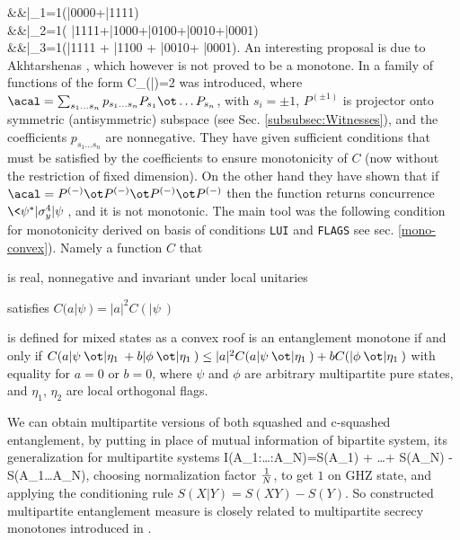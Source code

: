 \documentclass[rmp,12pt,preprint]{revtex4-2}
\begin{document}
\ben
&&|\Phi_1\>={1\over {}}(|0000\>+|1111\>) \nonumber \\
&&|\Phi_2\>={1\over {}}( |1111\>+|1000\>+|0100\>+|0010\>+|0001\>)
\nonumber \\
&&|\Phi_3\>={1}(|1111\> + |1100\> + |0010\>+ |0001\>).
\een
 An interesting proposal is due to Akhtarshenas
\cite{Akhtarshenas2003-multiconc}, which however is not proved to be
a monotone. In \cite{MintertKB2004-multi,DemkowiczBKM2006-multi}
a family of functions of the form
\be
C_{\acal}(|\psi\>)=2\sqrt{\<\psi|\ot \<\psi| {\acal} |\psi\>\ot |\psi\>}
\ee
was introduced, where $\acal=\sum_{s_1 \ldots s_n} p_{s_1 \ldots s_n}P_{s_1}
\ot \ldots P_{s_n}$,
with $s_i=\pm 1$, $P^{(\pm1)}$ is projector onto symmetric (antisymmetric)
subspace (see Sec. \ref{subsubsec:Witnesses}), and the coefficients $p_{s_1\ldots s_n}$ are nonnegative.
They have given sufficient conditions that must be satisfied by the coefficients to ensure monotonicity of $C$ (now without the restriction
of fixed dimension). On the other hand they have shown that  if $\acal = P^{(-)}\ot P^{(-)}\ot P^{(-)}\ot P^{(-)}$
then the function returns concurrence $\<\psi^*|\sigma_y^4|\psi\>$, and it is not monotonic.
The main tool was the following condition for monotonicity derived on basis of conditions {\tt LUI} and {\tt FLAGS} see sec. \ref{mono-convex}).
Namely  a function $C$ that\bei
\item is real, nonnegative and invariant under local unitaries
\item satisfies $C(a|\psi\>) = |a|^2C(|\psi\>)$
\item is defined for mixed states as a convex roof
\eei
is an entanglement monotone if and only if
$C(a|\psi\>\ot |\eta_1\> +b|\phi\>\ot |\eta_1\>) \leq |a|^2 C(a|\psi\>\ot |\eta_1\>) +bC(|\phi\>\ot |\eta_1\>)$
with equality for $a=0$ or $b=0$, where $\psi$  and $\phi$ are
arbitrary multipartite pure states, and $\eta_1$,  $\eta_2$  are local
orthogonal flags.

We can obtain multipartite versions of both squashed and c-squashed entanglement,
by putting in place of mutual information of bipartite system,
its generalization for multipartite systems \cite{multisquash}
\be
I(A_1:\ldots :A_N)=S(A_1) + \ldots + S(A_N) - S(A_1\ldots A_N),
\ee
choosing normalization factor ${1\over N}$, to get $1$ on GHZ state,
and applying the conditioning rule $S(X|Y)=S(XY)-S(Y)$.
So constructed multipartite entanglement measure
is closely related to multipartite secrecy monotones introduced in
\cite{Cerf-secr-mono}.
\end{document}
